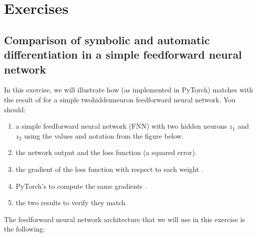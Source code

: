 \documentclass[letterpaper,10pt,english]{jupyterBook}
\begin{document}
\section{Exercises}
\label{\detokenize{04:exercises}}

\subsection{Comparison of symbolic and automatic differentiation in a simple feedforward neural network}
\label{\detokenize{04:comparison-of-symbolic-and-automatic-differentiation-in-a-simple-feedforward-neural-network}}
\sphinxAtStartPar
In this exercise, we will illustrate how  (as implemented in PyTorch) matches with the result of  for a simple two\sphinxhyphen{}hidden\sphinxhyphen{}neuron feedforward neural network. You should:
\begin{enumerate}
%
\item {} 
\sphinxAtStartPar
{} a simple feedforward neural network (FNN) with two hidden neurons \(z_1\) and \(z_2\) using the values and notation from the figure below.

\item {} 
\sphinxAtStartPar
{} the network output and the loss function (a squared error).

\item {} 
\sphinxAtStartPar
{} the gradient of the loss function with respect to each weight .

\item {} 
\sphinxAtStartPar
{} PyTorch’s  to compute the same gradients .

\item {} 
\sphinxAtStartPar
{} the two results to verify they match.

\end{enumerate}

\sphinxAtStartPar
The feedforward neural network architecture that we will use in this exercise is the following:
\end{document}

